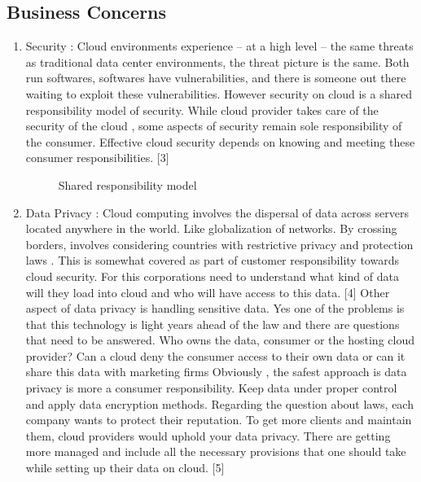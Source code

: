 \documentclass[journal]{hybrid-cloud}
\begin{document}
\subsection{Business Concerns}
\begin{enumerate}
	\item Security  : Cloud environments experience – at a high level – the same threats as traditional data center environments, the threat picture is the same. Both run softwares, softwares have vulnerabilities, and there is someone out there waiting to exploit these vulnerabilities. However security on cloud is a shared responsibility model of security. While cloud provider takes care of the security of the cloud , some aspects of security remain sole responsibility of the consumer. Effective cloud security depends
on knowing and meeting these consumer responsibilities.  [3]

\begin{figure}[h]
	\caption{\label{fig:shared_responsibility_model} Shared responsibility model}%
\end{figure}

	\item Data Privacy : Cloud computing involves the dispersal of data across servers located anywhere in
the world. Like globalization of networks. By crossing borders, involves considering
countries with restrictive privacy and protection laws . This is somewhat covered as
part of customer responsibility towards cloud security. For this corporations need to
understand what kind of data will they load into cloud and who will have access to
this data. [4]
Other aspect of data privacy is handling sensitive data. Yes one of the problems is
that this technology is light years ahead of the law and there are questions that need
to be answered. Who owns the data, consumer or the hosting cloud provider? Can
a cloud deny the consumer access to their own data or can it share this data with
marketing firms Obviously , the safest approach is data privacy is more a consumer
responsibility. Keep data under proper control and apply data encryption methods.
Regarding the question about laws, each company wants to protect their reputation.
To get more clients and maintain them, cloud providers would uphold your data
privacy. There are getting more managed and include all the necessary provisions
that one should take while setting up their data on cloud. [5] 


\end{enumerate}
\end{document}
